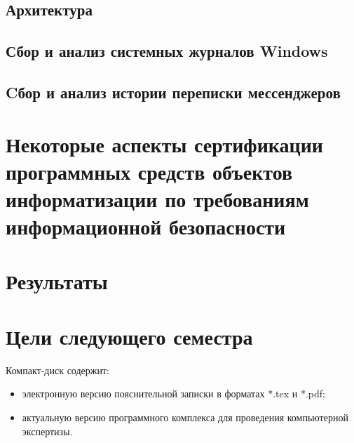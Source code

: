 \documentclass[russian,utf8,14pt,simple]{eskdtext}
\begin{document}
\subsection{Архитектура}
\setcounter{figure}{0}

\subsection{Сбор и анализ системных журналов Windows} %
\setcounter{figure}{0}

\subsection{Cбор и анализ истории переписки мессенджеров} %
\setcounter{figure}{0}


\section{Некоторые аспекты сертификации программных средств объектов\\ информатизации по требованиям информационной безопасности} %
\setcounter{figure}{0}


\newpage
\section{Результаты}


\section{Цели следующего семестра}


\newpage
\renewcommand{\refname}{Список использованных источников}


Компакт-диск содержит: 
\begin{itemize}
\item электронную версию пояснительной записки в форматах *.tex и *.pdf;
\item актуальную версию программного комплекса для проведения компьютерной экспертизы.
\end{itemize}
\end{document}
